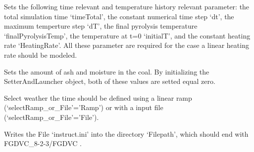 \documentclass[letterpaper,10pt,english]{sphinxmanual}
\begin{document}
\begin{fulllineitems}

\begin{fulllineitems}
\label{FGDVCClasses:FGDVC_SetAndLaunch.SetterAndLauncher.set7Ramp}
Sets the following time relevant and temperature history relevant parameter: the total simulation time `timeTotal', the constant numerical time step `dt', the maximum temperture step `dT', the final pyrolysis temperature `finalPyrolysisTemp', the temperature at t=0 `initialT', and the constant heating rate `HeatingRate'. All these parameter are required for the case a linear heating rate should be modeled.

\end{fulllineitems}


\begin{fulllineitems}
\label{FGDVCClasses:FGDVC_SetAndLaunch.SetterAndLauncher.set9AshMoisture}
Sets the amount of ash and moisture in the coal. By initializing the SetterAndLauncher object, both of these values are setted equal zero.

\end{fulllineitems}


\begin{fulllineitems}
\label{FGDVCClasses:FGDVC_SetAndLaunch.SetterAndLauncher.setTRamp_or_TFile}
Select weather the time should be defined using a linear ramp (`selectRamp\_or\_File'='Ramp') or with a input file (`selectRamp\_or\_File'='File').

\end{fulllineitems}


\begin{fulllineitems}
\label{FGDVCClasses:FGDVC_SetAndLaunch.SetterAndLauncher.writeInstructFile}
Writes the File `instruct.ini' into the directory `Filepath', which should end with FGDVC\_8-2-3/FGDVC .

\end{fulllineitems}


\end{fulllineitems}
\end{document}
